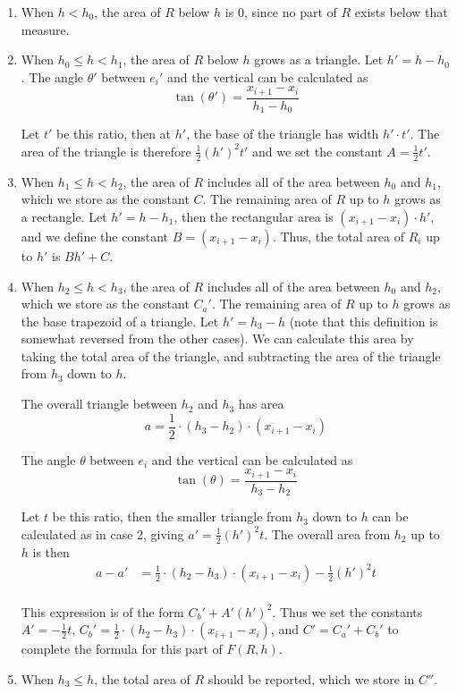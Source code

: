 \begin{enumerate}
\item When $h < h_0$, the area of $R$ below $h$ is 0, since no part of $R$ 
exists below that measure.

\item When $h_0 \leq h < h_1$, the area of $R$ below $h$ grows as a triangle. 
Let $h' = h - h_0$.
The angle $\theta'$ between $e_i'$ and the vertical can be calculated as 
\[ 
\tan(\theta') = \frac{x_{i+1} - x_i}{h_1 - h_0}
\]

Let $t'$ be this ratio, then at $h'$, the base of the triangle has width $h' 
\cdot t'$. The area of the triangle is therefore $\frac{1}{2} (h')^2 t'$ and we 
set the constant $A = \frac{1}{2} t'$.

\item When $h_1 \leq h < h_2$, the area of $R$ includes all of the area between 
$h_0$ and $h_1$, which we store as the constant $C$.
The remaining area of $R$ up to $h$ grows as a rectangle.
Let $h' = h - h_1$, then the rectangular area is $(x_{i+1} - x_i)\cdot h'$, and 
we define the constant $B = (x_{i+1} - x_i)$.
Thus, the total area of $R_i$ up to $h'$ is $Bh' + C$.

\item When $h_2 \leq h < h_3$, the area of $R$ includes all of the area between 
$h_0$ and $h_2$, which we store as the constant $C_a'$.
The remaining area of $R$ up to $h$ grows as the base trapezoid of a triangle.
Let $h' = h_3 - h$ (note that this definition is somewhat reversed from the 
other cases).
We can calculate this area by taking the total area of the triangle, and 
subtracting the area of the triangle from $h_3$ down to $h$.  

The overall triangle between $h_2$ and $h_3$ has area 
\[ 
a = \frac{1}{2} \cdot (h_3 - h_2) \cdot (x_{i+1} - x_i) 
\]

The angle $\theta$ between $e_i$ and the vertical can be calculated as
\[ 
\tan(\theta) = \frac{x_{i+1} - x_i}{h_3 - h_2}
\]

Let $t$ be this ratio, then the smaller triangle from $h_3$ down to $h$ can be 
calculated as in case 2, giving $a' = \frac{1}{2}(h')^2 t$. 
The overall area from $h_2$ up to $h$ is then
\[ 
\begin{split}
a - a' &= \frac{1}{2} \cdot (h_2 - h_3) \cdot (x_{i+1} - x_i) - 
\frac{1}{2}(h')^2 t \\
%
\end{split}
\]

This expression is of the form $C_b' + A'(h')^2$.
Thus we set the constants $A' = -\frac{1}{2}t$, $C_b' = \frac{1}{2} \cdot (h_2 - 
h_3) \cdot (x_{i+1} - x_i)$, and $C' = C_a' + C_b'$ to complete the formula for 
this part of $F(R, h)$.

\item When $h_3 \leq h$, the total area of $R$ should be reported, which we 
store in $C''$.

\end{enumerate}

